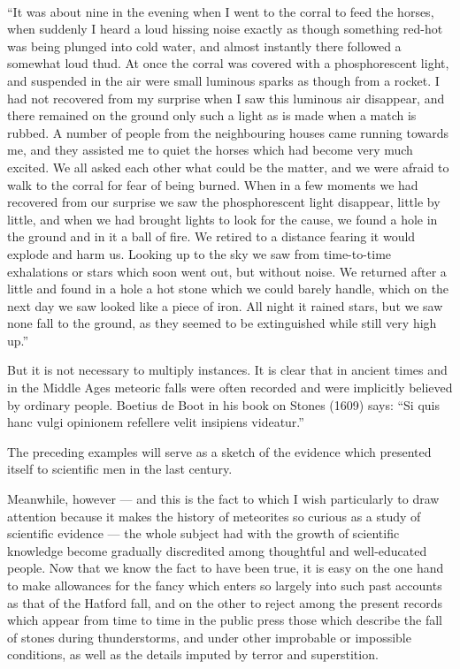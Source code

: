 \documentclass[a4paper, 11pt, oneside]{article}
\begin{document}
\paragraph{}
``It was about nine in the evening when I went to the corral to feed the horses, when suddenly I heard a loud hissing noise exactly as though something red-hot was being plunged into cold water, and almost instantly there followed a somewhat loud thud. At once the corral was covered with a phosphorescent light, and suspended in the air were small luminous sparks as though from a rocket. I had not recovered from my surprise when I saw this luminous air disappear, and there remained on the ground only such a light as is made when a match is rubbed. A number of people from the neighbouring houses came running towards me, and they assisted me to quiet the horses which had become very much excited. We all asked each other what could be the matter, and we were afraid to walk to the corral for fear of being burned. When in a few moments we had recovered from our surprise we saw the phosphorescent light disappear, little by little, and when we had brought lights to look for the cause, we found a hole in the ground and in it a ball of fire. We retired to a distance fearing it would explode and harm us. Looking up to the sky we saw from time-to-time exhalations or stars which soon went out, but without noise. We returned after a little and found in a hole a hot stone which we could barely handle, which on the next day we saw looked like a piece of iron. All night it rained stars, but we saw none fall to the ground, as they seemed to be extinguished while still very high up.'' 

But it is not necessary to multiply instances. It is clear that in ancient times and in the Middle Ages meteoric falls were often recorded and were implicitly believed by ordinary people. Boetius de Boot in his book on Stones (1609) says: ``Si quis hanc vulgi opinionem refellere velit insipiens videatur.''

The preceding examples will serve as a sketch of the evidence which presented itself to scientific men in the last century. 

Meanwhile, however --- and this is the fact to which I wish particularly to draw attention because it makes the history of meteorites so curious as a study of scientific evidence --- the whole subject had with the growth of scientific knowledge become gradually discredited among thoughtful and well-educated people. Now that we know the fact to have been true, it is easy on the one hand to make allowances for the fancy which enters so largely into such past accounts as that of the Hatford fall, and on the other to reject among the present records which appear from time to time in the public press those which describe the fall of stones during thunderstorms, and under other improbable or impossible conditions, as well as the details imputed by terror and superstition. 
\end{document}
